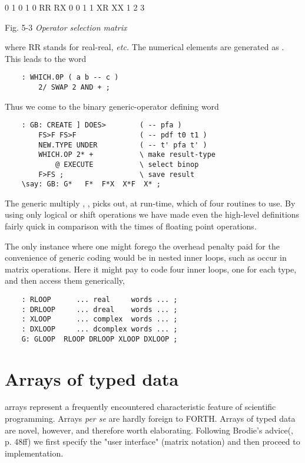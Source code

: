   0  1        0 1
0 RR RX     0 0 1
1 XR XX     1 2 3

Fig. 5-3 \textit{Operator selection matrix}

where RR stands for real-real, \textit{etc.} The numerical elements are generated as . This leads to the word

\begin{lstlisting}
    : WHICH.0P ( a b -- c )
        2/ SWAP 2 AND + ;
\end{lstlisting}

Thus we come to the binary generic-operator defining word
\begin{lstlisting}
    : GB: CREATE ] DOES>        ( -- pfa )
        FS>F FS>F               ( -- pdf t0 t1 )
        NEW.TYPE UNDER          ( -- t' pfa t' )
        WHICH.OP 2* +           \ make result-type
            @ EXECUTE           \ select binop
        F>FS ;                  \ save result
    \say: GB: G*   F*  F*X  X*F  X* ;
\end{lstlisting}

The generic multiply , \eg, picks out, at run-time, which of four routines to use. By using only logical or shift operations we have made even the high-level definitions fairly quick in comparison with the times of floating point operations.

The only instance where one might forego the overhead penalty paid for the convenience of generic coding would be in nested inner loops, such as occur in matrix operations. Here it might pay to code four inner loops, one for each type, and then access them generically, \eg

\begin{lstlisting}
    : RLOOP      ... real     words ... ;
    : DRLOOP     ... dreal    words ... ;
    : XLOOP      ... complex  words ... ;
    : DXLOOP     ... dcomplex words ... ;
    G: GLOOP  RLOOP DRLOOP XLOOP DXLOOP ;
\end{lstlisting}

\section{Arrays of typed data}

 arrays represent a frequently encountered characteristic feature of scientific programming. Arrays \textit{per se} are hardly foreign to FORTH. Arrays of typed data are novel, however, and therefore worth elaborating. Following Brodie's advice(\TF, p. 48ff) we first specify the "user interface" (matrix notation) and then proceed to implementation.

